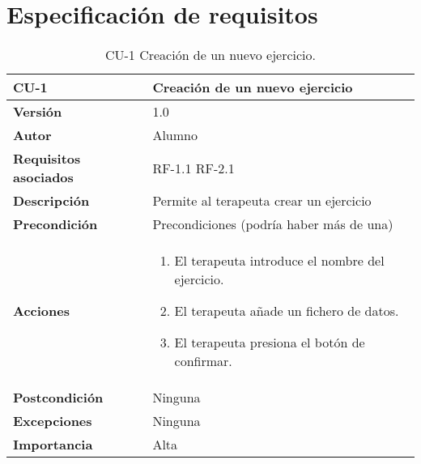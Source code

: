 \section{Especificación de requisitos}


\begin{table}[p]
	\centering
	\begin{tabularx}{\linewidth}{ p{} p{} }
		\toprule
		\textbf{CU-1}    & \textbf{Creación de un nuevo ejercicio}\\
		\toprule
		\textbf{Versión}              & 1.0    \\
		\textbf{Autor}                & Alumno \\
		\textbf{Requisitos asociados} & RF-1.1 RF-2.1 \\
		\textbf{Descripción}          & Permite al terapeuta crear un ejercicio   \\
		\textbf{Precondición}         & Precondiciones (podría haber más de una) \\
		\textbf{Acciones}             &
		\begin{enumerate}
			\def\labelenumi{\arabic{enumi}.}
			\tightlist
			\item El terapeuta introduce el nombre del ejercicio.
			\item El terapeuta añade un fichero de datos.
			\item El terapeuta presiona el botón de confirmar.
		\end{enumerate}\\
		\textbf{Postcondición}        & Ninguna \\
		\textbf{Excepciones}          & Ninguna \\
		\textbf{Importancia}          & Alta \\
		\bottomrule
	\end{tabularx}
	\caption{CU-1 Creación de un nuevo ejercicio.}
\end{table}

